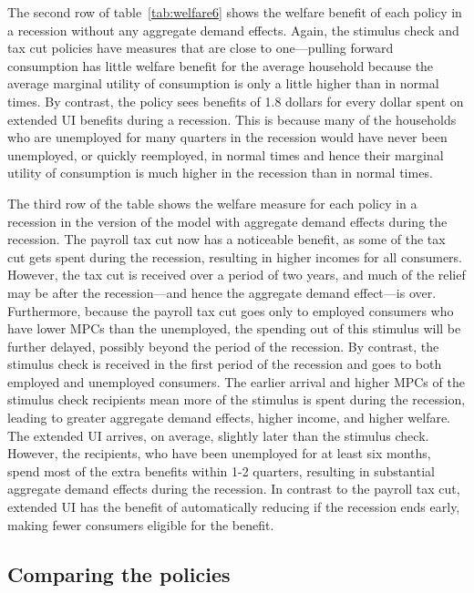 \documentclass[qe]{econsocart}
\begin{document}
The second row of table~\ref{tab:welfare6} shows the welfare benefit of each policy in a recession without any aggregate demand effects.
Again, the stimulus check and tax cut policies have measures that are close to one---pulling forward consumption has little welfare benefit for the average household because the average marginal utility of consumption is only a little higher than in normal times.
By contrast, the policy sees benefits of 1.8 dollars for every dollar spent on extended UI benefits during a recession.
This is because many of the households who are unemployed for many quarters in the recession would have never been unemployed, or quickly reemployed, in normal times and hence their marginal utility of consumption is much higher in the recession than in normal times.

The third row of the table shows the welfare measure for each policy in a recession in the version of the model with aggregate demand effects during the recession.
The payroll tax cut now has a noticeable benefit, as some of the tax cut gets spent during the recession, resulting in higher incomes for all consumers.
However, the tax cut is received over a period of two years, and much of the relief may be after the recession---and hence the aggregate demand effect---is over.
Furthermore, because the payroll tax cut goes only to employed consumers who have lower MPCs than the unemployed, the spending out of this stimulus will be further delayed, possibly beyond the period of the recession.
By contrast, the stimulus check is received in the first period of the recession and goes to both employed and unemployed consumers.
The earlier arrival and higher MPCs of the stimulus check recipients mean more of the stimulus is spent during the recession, leading to greater aggregate demand effects, higher income, and higher welfare.
The extended UI arrives, on average, slightly later than the stimulus check.
However, the recipients, who have been unemployed for at least six months, spend most of the extra benefits within 1-2 quarters, resulting in substantial aggregate demand effects during the recession.
In contrast to the payroll tax cut, extended UI has the benefit of automatically reducing if the recession ends early, making fewer consumers eligible for the benefit.

\subsection{Comparing the policies}
\label{subsec:comparing-the-policies} 
\end{document}
